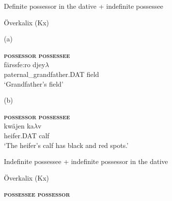 Definite possessor in the dative + indefinite possessee



\item 

Överkalix (Kx)



(a)

\ea\label{}
\gll \textbf{\textsc{possessor}}  \textbf{\textsc{possessee}}\\
\gll färssfe:ro  djey$\lambda $\\
paternal\_grandfather.DAT  field\\
\glt ‘Grandfather’s field’
\z

(b)

\ea\label{}
\gll \textbf{\textsc{possessor}} \textbf{\textsc{possessee}}\\
\gll kwäjen  ka$\lambda $v\\
heifer.DAT  calf\\
\glt ‘The heifer’s calf has black and red spots.’
\z

\item 

Indefinite possessee + indefinite possessor in the dative



\item 

Överkalix (Kx)



\textbf{\textsc{possessee}} \textbf{\textsc{possessor}}

